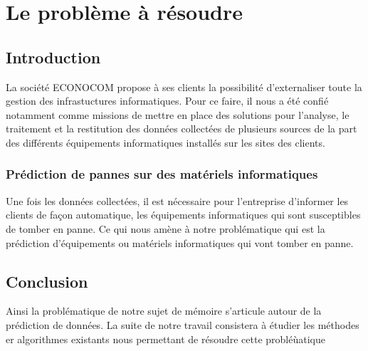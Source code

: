\chapter{Le problème à résoudre}
\minitoc
\newpage
 


\section{Introduction}

La société ECONOCOM propose à ses clients la possibilité d'externaliser toute la gestion des infrastuctures informatiques. Pour ce faire, il nous a été confié notamment comme missions de mettre en place des solutions pour l'analyse, le traitement et la restitution des données collectées de plusieurs sources de la part des différents équipements informatiques installés sur les sites des clients.


\subsection {Prédiction de pannes sur des matériels informatiques}
Une fois les données collectées, il est nécessaire pour l'entreprise d'informer les clients de façon automatique, les équipements informatiques qui sont susceptibles de tomber en panne. Ce qui nous amène à notre problématique qui est la prédiction d'équipements ou matériels  informatiques qui vont tomber en panne. 

\section{Conclusion }
Ainsi la problématique de notre sujet de mémoire s'articule autour de la prédiction de données. La suite de notre travail consistera à étudier les méthodes er algorithmes existants nous permettant de résoudre cette probléùatique
